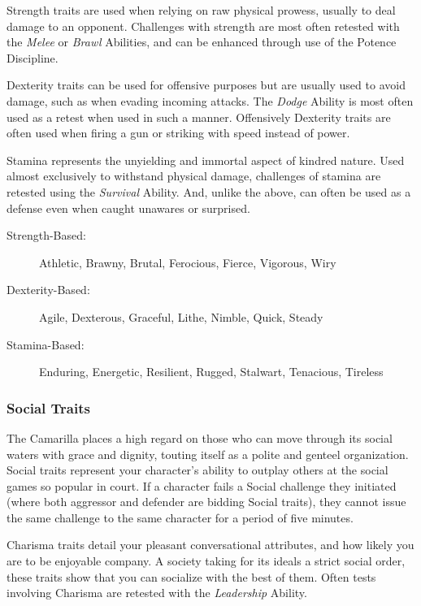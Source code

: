 Strength traits are used when relying on raw physical prowess, usually 
to deal damage to an opponent.  Challenges with strength are most often 
retested with the \emph{Melee} or \emph{Brawl} Abilities, and can be 
enhanced through use of the Potence Discipline.

Dexterity traits can be used for offensive purposes but are usually used 
to avoid damage, such as when evading incoming attacks.  The \emph{Dodge} 
Ability is most often used as a retest when used in such a manner.  
Offensively Dexterity traits are often used when firing a gun or striking 
with speed instead of power.

Stamina represents the unyielding and immortal aspect of kindred nature.  
Used almost exclusively to withstand physical damage, challenges of stamina are 
retested using the \emph{Survival} Ability.  And, unlike the above, can often 
be used as a defense even when caught unawares or surprised.

\begin{description}
	\item[Strength-Based:]  Athletic, Brawny, Brutal, Ferocious, Fierce, 
	Vigorous, Wiry
	\item[Dexterity-Based:]  Agile, Dexterous, Graceful, Lithe, Nimble, 
	Quick, Steady
	\item[Stamina-Based:]  Enduring, Energetic, Resilient, Rugged, 
	Stalwart, Tenacious, Tireless
\end{description}

\subsubsection{Social Traits}
The Camarilla places a high regard on those who can move through its social 
waters with grace and dignity, touting itself as a polite and genteel 
organization.  Social traits represent your character's ability to 
outplay others at the social games so popular in court.  If a character fails a 
Social challenge they initiated (where both aggressor and defender are bidding 
Social traits), they cannot issue the same challenge to the same character for 
a period of five minutes.

Charisma traits detail your pleasant conversational attributes, and how 
likely you are to be enjoyable company.  A society taking for its ideals 
a strict social order, these traits show that you can socialize with the 
best of them.  Often tests involving Charisma are retested with the 
\emph{Leadership} Ability.

